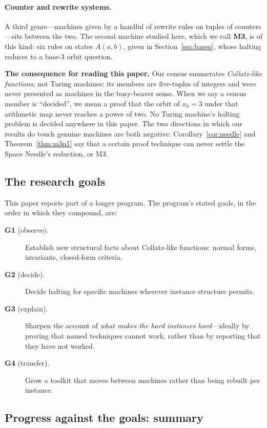 \documentclass[11pt]{article}
\theoremstyle{definition}
\theoremstyle{remark}
\begin{document}
\paragraph{Counter and rewrite systems.}
A third genre---machines given by a handful of rewrite rules on tuples of
counters---sits between the two.  The second machine studied here, which we
call \textbf{M3}, is of this kind: six rules on states $A(a,b)$, given in
Section~\ref{sec:baseq}, whose halting reduces to a base-$3$ orbit question.

\medskip
\noindent
\textbf{The consequence for reading this paper.}  Our census enumerates
\emph{Collatz-like functions}, not Turing machines: its members are five-tuples
of integers and were never presented as machines in the busy-beaver sense.
When we say a census member is ``decided'', we mean a proof that the orbit of
$x_0=3$ under that arithmetic map never reaches a power of two.  No Turing
machine's halting problem is decided anywhere in this paper.  The two
directions in which our results do touch genuine machines are both negative:
Corollary~\ref{cor:needle} and Theorem~\ref{thm:m3n1} say that a certain
proof technique can never settle the Space Needle's reduction, or M3.

\subsection{The research goals}
\label{sec:goals}

This paper reports part of a longer program.  The program's stated goals, in
the order in which they compound, are:

\begin{description}
\item[\textbf{G1} (observe).] Establish new structural facts about
  Collatz-like functions: normal forms, invariants, closed-form criteria.
\item[\textbf{G2} (decide).] Decide halting for specific machines wherever
  instance structure permits.
\item[\textbf{G3} (explain).] Sharpen the account of \emph{what makes the hard
  instances hard}---ideally by proving that named techniques cannot work,
  rather than by reporting that they have not worked.
\item[\textbf{G4} (transfer).] Grow a toolkit that moves between machines
  rather than being rebuilt per instance.
\end{description}

\subsection{Progress against the goals: summary}
\label{sec:summary}
\end{document}
